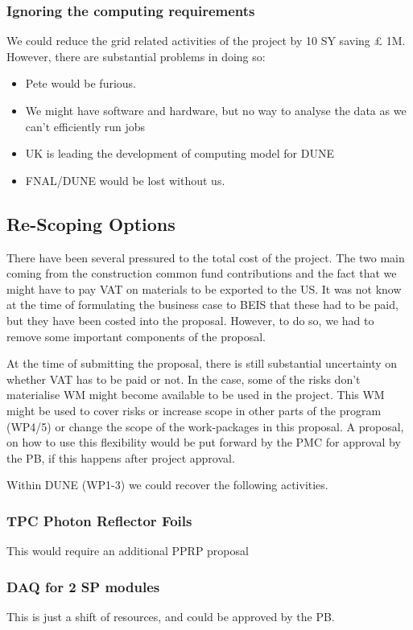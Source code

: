 \subsubsection{Ignoring the computing requirements}
We could reduce the grid related activities of the project by 10 SY saving £ 1M.
However, there are substantial problems in doing so:
\begin{itemize}
    \item Pete would be furious.
    \item We might have software and hardware, but no way to analyse the data as we can't efficiently run jobs
    \item UK is leading the development of computing model for DUNE
    \item FNAL/DUNE would be lost without us.
\end{itemize}


\subsection{Re-Scoping Options}

There have been several pressured to the total cost of the project. The two main coming from the construction common fund contributions and the fact that we might have to pay VAT on materials to be exported to the US. It was not know at the time of formulating the business case to BEIS that these had to be paid, but they have been costed into the proposal. However, to do so, we had to remove some important components of the proposal.

At the time of submitting the proposal, there is still substantial uncertainty on whether VAT has to be paid or not. In the case, some of the risks don't materialise WM might become available to be used in the project. This WM might be used to cover risks or increase scope in other parts of the program (WP4/5) or change the scope of the work-packages in this proposal. A proposal, on how to use this flexibility would be put forward by the PMC for approval by the PB, if this happens after project approval.

Within DUNE (WP1-3) we could recover the following activities.

\subsubsection{TPC Photon Reflector Foils}
 
This would require an additional PPRP proposal
 
\subsubsection{DAQ for 2 SP modules}

This is just a shift of resources, and could be approved by the PB.
